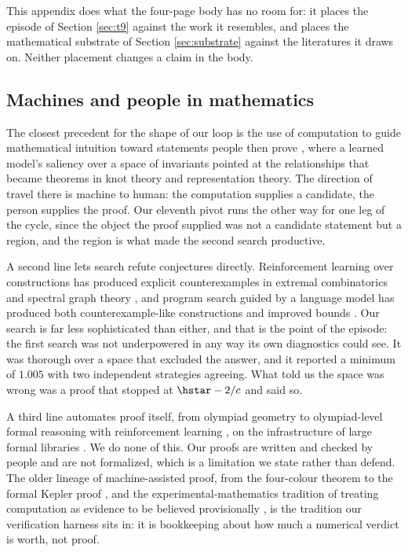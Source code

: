 This appendix does what the four-page body has no room for: it places the
episode of Section \ref{sec:t9} against the work it resembles, and places the
mathematical substrate of Section \ref{sec:substrate} against the literatures
it draws on. Neither placement changes a claim in the body.

\subsection{Machines and people in mathematics}

The closest precedent for the shape of our loop is the use of computation to
guide mathematical intuition toward statements people then prove
\citep{davies2021advancing}, where a learned model's saliency over a space of
invariants pointed at the relationships that became theorems in knot theory
and representation theory. The direction of travel there is machine to human:
the computation supplies a candidate, the person supplies the proof. Our
eleventh pivot runs the other way for one leg of the cycle, since the object
the proof supplied was not a candidate statement but a region, and the
region is what made the second search productive.

A second line lets search refute conjectures directly. Reinforcement learning
over constructions has produced explicit counterexamples in extremal
combinatorics and spectral graph theory \citep{wagner2021constructions}, and
program search guided by a language model has produced both counterexample-like
constructions and improved bounds \citep{romera2024mathematical}. Our search is
far less sophisticated than either, and that is the point of the episode: the
first search was not underpowered in any way its own diagnostics could see. It
was thorough over a space that excluded the answer, and it reported a minimum
of $1.005$ with two independent strategies agreeing. What told us the space was
wrong was a proof that stopped at $\hstar - 2/c$ and said so.

A third line automates proof itself, from olympiad geometry
\citep{trinh2024solving} to olympiad-level formal reasoning with reinforcement
learning \citep{hubert2025olympiad}, on the infrastructure of large formal
libraries \citep{mathlib2020}. We do none of this. Our proofs are written and
checked by people and are not formalized, which is a limitation we state rather
than defend. The older lineage of machine-assisted proof, from the four-colour
theorem \citep{appel1977every} to the formal Kepler proof
\citep{hales2017formal}, and the experimental-mathematics tradition of treating
computation as evidence to be believed provisionally
\citep{borwein2008mathematics}, is the tradition our verification harness sits
in: it is bookkeeping about how much a numerical verdict is worth, not proof.

